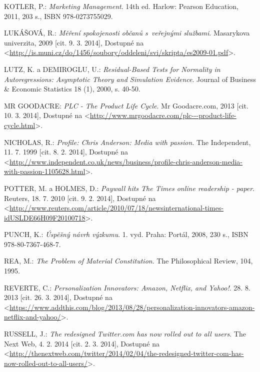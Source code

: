 \documentclass[12pt,twoside,openany]{fithesis}
\begin{document}
\begin{thebibliography}{99}
KOTLER, P.: \emph{Marketing Management}. 14th ed. Harlow: Pearson Education, 2011, 203 s., ISBN 978-0273755029.

LUKÁŠOVÁ, R.: \emph{Měření spokojenosti občanů s~veřejnými službami}. Masarykova univerzita, 2009 [cit. 9. 3. 2014], Dostupné na {\textless}\url{http://is.muni.cz/do/1456/soubory/oddeleni/svi/skripta/es2009-01.pdf}{\textgreater}.

LUTZ, K. a DEMIROGLU, U.: \emph{Residual-Based Tests for Normality in Autoregressions: Asymptotic
      Theory and Simulation Evidence}. Journal of Business \& Economic Statistics 18
        (1), 2000, s. 40-50.

MR GOODACRE: \emph{PLC - The Product Life Cycle}. Mr Goodacre.com, 2013 [cit. 10. 3. 2014], Dostupné na {\textless}\url{http://www.mrgoodacre.com/plc---product-life-cycle.html}{\textgreater}.

NICHOLAS, R.: \emph{Profile: Chris Anderson: Media with passion}. The Independent, 11. 7. 1999 [cit. 8. 2. 2014], Dostupné na {\textless}\url{http://www.independent.co.uk/news/business/profile-chris-anderson-media-with-passion-1105628.html}{\textgreater}.

POTTER, M. a HOLMES, D.: \emph{Paywall hits The Times online readership - paper}. Reuters, 18. 7. 2010 [cit. 9. 2. 2014], Dostupné na {\textless}\url{http://www.reuters.com/article/2010/07/18/newsinternational-times-idUSLDE66H09F20100718}{\textgreater}.

PUNCH, K.: \emph{Úspěšný návrh výzkumu}. 1. vyd. Praha: Portál, 2008, 230 s., ISBN 978-80-7367-468-7.

REA, M.: \emph{The Problem of Material Constitution}. The Philosophical Review, 104, 1995.

REVERTE, C.: \emph{Personalization Innovators: Amazon, Netflix, and Yahoo!}. 28. 8. 2013 [cit. 26. 3. 2014], Dostupné na {\textless}\url{https://www.addthis.com/blog/2013/08/28/personalization-innovators-amazon-netflix-and-yahoo/}{\textgreater}.

RUSSELL, J.: \emph{The redesigned Twitter.com has now rolled out to all users}.
The Next Web, 4. 2. 2014 [cit. 2. 3. 2014], Dostupné na {\textless}\url{http://thenextweb.com/twitter/2014/02/04/the-redesigned-twitter-com-has-now-rolled-out-to-all-users/}{\textgreater}.


\end{thebibliography}
\end{document}
